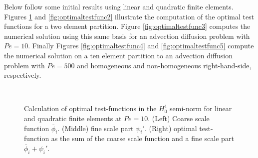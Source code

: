 Below follow some initial results using linear and quadratic finite elements. Figures \ref{fig:optimaltestfunc1} and \ref{fig:optimaltestfunc2} illustrate the computation of the optimal test functions for a two element partition. Figure \ref{fig:optimaltestfunc3} computes the numerical solution using this same basis for an advection diffusion problem with $Pe = 10$. Finally Figures \ref{fig:optimaltestfunc4} and \ref{fig:optimaltestfunc5} compute the numerical solution on a ten element partition to an advection diffusion problem with $Pe = 500$ and homogeneous and non-homogeneous right-hand-side, respectively. 
\begin{figure}
	\centering
	 \\
	\caption{Calculation of optimal test-functions in the $H^1_0$ semi-norm for linear and quadratic finite elements at $Pe=10$. (Left) Coarse scale function $\bar{\phi}_i$. (Middle)  fine scale part $\psi_i'$. (Right) optimal test-function as the sum of the coarse scale function and a fine scale part $\bar{\phi}_i + \psi_i'$.}
	\label{fig:optimaltestfunc1}
\end{figure}

